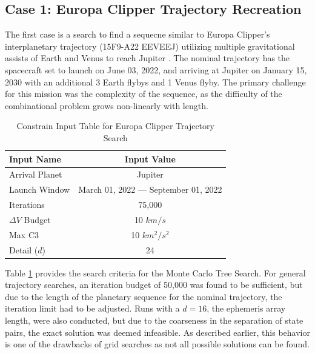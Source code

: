 \documentclass[letterpaper, preprint, paper,11pt]{AAS}	%
\begin{document}
\subsection{Case 1: Europa Clipper Trajectory Recreation}

The first case is a search to find a sequecne similar to Europa Clipper's interplanetary trajectory (15F9-A22 EEVEEJ) utilizing multiple gravitational assists of Earth and Venus to reach Jupiter \cite{Buffington2014}. The nominal trajectory has the spacecraft set to launch on June 03, 2022, and arriving at Jupiter on January 15, 2030 with an additional 3 Earth flybys and 1 Venus flyby. The primary challenge for this mission was the complexity of the sequence, as the difficulty of the combinational problem grows non-linearly with length.
\begin{table}[htb]
    \centering
    \caption{Constrain Input Table for Europa Clipper Trajectory Search}
    \label{table:clipInputs}
    \begin{tabular}{lc}
        \toprule
        \textbf{Input Name} & \textbf{Input Value}\\
        \midrule
        Arrival Planet & Jupiter \\
        Launch Window & March 01, 2022 --- September 01, 2022 \\
        Iterations & 75,000 \\ 
        $\Delta V$ Budget & 10 $km/s$ \\
        Max C3 & 10 $km^2/s^2$ \\
        Detail ($d$) & 24 \\
        \bottomrule
    \end{tabular}
\end{table}


Table \ref*{table:clipInputs} provides the search criteria for the Monte Carlo Tree Search. For general trajectory searches, an iteration budget of 50,000 was found to be sufficient, but due to the length of the planetary sequence for the nominal trajectory, the iteration limit had to be adjusted. Runs with a $d = 16$, the ephemeris array length, were also conducted, but due to the coarseness in the separation of state pairs, the exact solution was deemed infeasible. As described earlier, this behavior is one of the drawbacks of grid searches as not all possible solutions can be found. 
\end{document}
